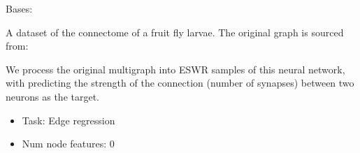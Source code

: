 \documentclass[letterpaper,10pt,english]{sphinxhowto}
\begin{document}
\begin{fulllineitems}

\begin{fulllineitems}
\label{\detokenize{datasets:datasets.FacebookDataset.raw_file_names}}
\pysigstartsignatures
{}
\pysigstopsignatures
\end{fulllineitems}


\end{fulllineitems}


\begin{fulllineitems}
\label{\detokenize{datasets:datasets.NeuralDataset}}
\pysigstartsignatures
{}
\pysigstopsignatures
\sphinxAtStartPar
Bases: 

\sphinxAtStartPar
A dataset of the connectome of a fruit fly larvae.
The original graph is sourced from:
\begin{quote}

\sphinxAtStartPar
{}
\end{quote}

\sphinxAtStartPar
We process the original multigraph into ESWR samples of this neural network, with predicting the strength of the connection (number of synapses) between two neurons as the target.
\begin{itemize}
\item {} 
\sphinxAtStartPar
Task: Edge regression

\item {} 
\sphinxAtStartPar
Num node features: 0


\end{itemize}
\end{fulllineitems}
\end{document}

